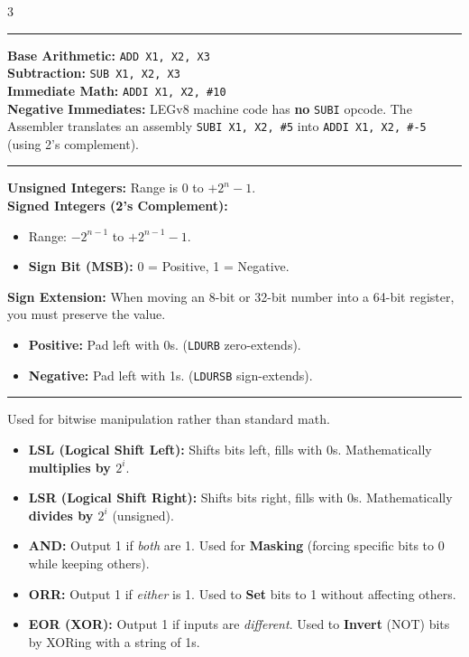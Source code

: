 \documentclass[6pt, letterpaper]{article}
\newcommand{\sectionhead}[1]{%
    \vspace{1mm}{\large\bfseries#1}\vspace{0.2mm}\hrule\vspace{0.8mm}%
}
\begin{document}
\begin{multicols}{3}

\sectionhead{Arithmetic \& Immediates}
\textbf{Base Arithmetic:} \texttt{ADD X1, X2, X3} \\
\textbf{Subtraction:} \texttt{SUB X1, X2, X3} \\
\textbf{Immediate Math:} \texttt{ADDI X1, X2, \#10} \\
\textbf{Negative Immediates:} LEGv8 machine code has \textbf{no} \texttt{SUBI} opcode. The Assembler translates an assembly \texttt{SUBI X1, X2, \#5} into \texttt{ADDI X1, X2, \#-5} (using 2's complement).

\sectionhead{Binary Numbers \& Math}
\textbf{Unsigned Integers:} Range is $0$ to $+2^n - 1$. \\
\textbf{Signed Integers (2's Complement):} 
\begin{itemize}
    \item Range: $-2^{n-1}$ to $+2^{n-1} - 1$.
    \item \textbf{Sign Bit (MSB):} 0 = Positive, 1 = Negative.
\end{itemize}



\textbf{Sign Extension:}
When moving an 8-bit or 32-bit number into a 64-bit register, you must preserve the value.
\begin{itemize}
    \item \textbf{Positive:} Pad left with 0s. (\texttt{LDURB} zero-extends).
    \item \textbf{Negative:} Pad left with 1s. (\texttt{LDURSB} sign-extends).
\end{itemize}

\sectionhead{Logical Operations}
Used for bitwise manipulation rather than standard math.
\begin{itemize}
    \item \textbf{LSL (Logical Shift Left):} Shifts bits left, fills with 0s. Mathematically \textbf{multiplies by $2^i$}.
    \item \textbf{LSR (Logical Shift Right):} Shifts bits right, fills with 0s. Mathematically \textbf{divides by $2^i$} (unsigned).
    \item \textbf{AND:} Output 1 if \textit{both} are 1. Used for \textbf{Masking} (forcing specific bits to 0 while keeping others).
    \item \textbf{ORR:} Output 1 if \textit{either} is 1. Used to \textbf{Set} bits to 1 without affecting others.
    \item \textbf{EOR (XOR):} Output 1 if inputs are \textit{different}. Used to \textbf{Invert} (NOT) bits by XORing with a string of 1s.
\end{itemize}




\end{multicols}
\end{document}
